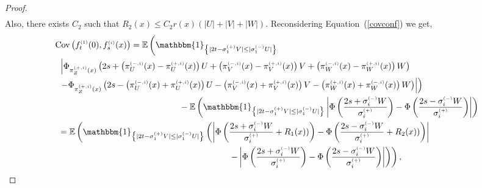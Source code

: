 \documentclass[12pt]{article}
\theoremstyle{Theorem}
\theoremstyle{definition}
\begin{document}
\begin{proof}
{\begin{align*}
\end{align*}}Also, there exists $C_2$ such that $R_{2}(x) \leq C_{2}r(x)\left(|U| + |V| + |W|\right)$. 
Reconsidering Equation~(\ref{covconf}) we get,
{\small
\begin{align*}
 \text{Cov}\left(f_{t}^{\scriptscriptstyle(1)}(0), f_{s}^{\scriptscriptstyle(i)}(x) \right) & =  \mathbb{E}\left(\mathbbm{1}_{\left\{ |2t - \sigma^{\scriptscriptstyle (+)}_{1}V| \leq |\sigma^{\scriptscriptstyle (-)}_{1}U|\right\}}\right. \\
&\hspace{-3cm} \left. \left|\Phi_{ \pi^{\scriptscriptstyle(+, i)}_{Z}(x)}\left( 2s + \left( \pi^{\scriptscriptstyle(-, i)}_{U}(x)- \pi^{\scriptscriptstyle(+, i)}_{U}(x)\right) U + \left(\pi^{\scriptscriptstyle(-, i)}_{V}(x)- \pi^{\scriptscriptstyle(+, i)}_{V}(x)\right)V + \left(\pi^{\scriptscriptstyle(-, i)}_{W}(x) - \pi^{\scriptscriptstyle(+, i)}_{W}(x)\right) W \right) \right. \right.  \nonumber \\
& \hspace{-3cm}\left. \left.  - \Phi_{ \pi^{\scriptscriptstyle(+, i)}_{Z}(x)}\left( 2s - \left( \pi^{\scriptscriptstyle(-, i)}_{U}(x)+ \pi^{\scriptscriptstyle(+, i)}_{U}(x)\right) U - \left(\pi^{\scriptscriptstyle(-, i)}_{V}(x)+ \pi^{\scriptscriptstyle(+, i)}_{V}(x)\right)V   - \left( \pi^{\scriptscriptstyle(+, i)}_{W}(x) +  \pi^{\scriptscriptstyle(-, i)}_{W}(x) \right)W \right)  \right| \right) \\
& \hspace{2cm} - \mathbb{E}\left(\mathbbm{1}_{\left\{ |2t - \sigma^{\scriptscriptstyle (+)}_{1}V| \leq |\sigma^{\scriptscriptstyle (-)}_{1}U|\right\}}\left|\Phi\left(\frac{2s + \sigma^{\scriptscriptstyle (-)}_{i}W}{\sigma^{\scriptscriptstyle (+)}_{i}} \right) - \Phi\left(\frac{2s -\sigma^{\scriptscriptstyle (-)}_{i}W }{\sigma^{\scriptscriptstyle (+)}_{i}} \right)\right|\right)\\
& \hspace{-3cm} = \mathbb{E}\left(\mathbbm{1}_{\left\{ |2t - \sigma^{\scriptscriptstyle (+)}_{1}V| \leq |\sigma^{\scriptscriptstyle (-)}_{1}U|\right\}} \left(\left|\Phi\left(\frac{2s + \sigma^{\scriptscriptstyle (-)}_{i}W}{\sigma^{\scriptscriptstyle (+)}_{i}} + R_{1}(x)) \right) - \Phi\left(\frac{2s -\sigma^{\scriptscriptstyle (-)}_{i}W }{\sigma^{\scriptscriptstyle (+)}_{i}} + R_{2}(x))\right)\right| \right. \right. \\
& \hspace{4cm} \left.\left. -  \left|\Phi\left(\frac{2s + \sigma^{\scriptscriptstyle (-)}_{i}W}{\sigma^{\scriptscriptstyle (+)}_{i}} \right) - \Phi\left(\frac{2s -\sigma^{\scriptscriptstyle (-)}_{i}W }{\sigma^{\scriptscriptstyle (+)}_{i}} \right)\right| \right)\right),

\end{align*}}
\end{proof}
\end{document}
